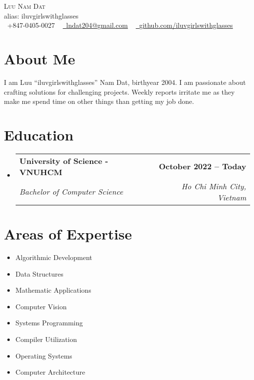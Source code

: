 \documentclass[letterpaper,11pt]{article}
\makeatletter
\newcommand{\resumeSubheading}[4]{
\vspace{-2pt}\item
\begin{tabular*}{1.0\textwidth}[t]{l@{\extracolsep{\fill}}r}
\textbf{#1} & \textbf{\small #2} \\
\textit{\small#3} & \textit{\small #4} \\
    \end{tabular*}\vspace{-7pt}
}
\newcommand{\resumeSubHeadingListStart}{\begin{itemize}[leftmargin=0.0in, label={}]}
\newcommand{\resumeSubHeadingListEnd}{\end{itemize}}
\makeatother
\begin{document}

\begin{center}
{\Huge \scshape Luu Nam Dat} \\ \vspace{1pt}
alias: iluvgirlswithglasses \\ \vspace{1pt}
\small \raisebox{-0.1\height}\faPhone\ +847-0405-0027 ~ \href{mailto:lndat204@gmail.com}{\raisebox{-0.2\height}\faEnvelope\  \underline{lndat204@gmail.com}} ~ 
\href{https://github.com/iluvgirlswithglasses}{\raisebox{-0.2\height}\faGithub\ \underline{github.com/iluvgirlswithglasses}}
\vspace{-8pt}
\end{center}


\section{About Me}
I am Luu ``iluvgirlswithglasses'' Nam Dat, birthyear 2004. I am passionate about crafting solutions for challenging projects. Weekly reports irritate me as they make me spend time on other things than getting my job done.


\section{Education}
\resumeSubHeadingListStart
\resumeSubheading
{University of Science - VNUHCM}{October 2022 -- Today}
{Bachelor of Computer Science}{Ho Chi Minh City, Vietnam}
\resumeSubHeadingListEnd


\section{Areas of Expertise}
\begin{multicols}{4}
\begin{itemize}[itemsep=-5pt, parsep=3pt]
\item\small Algorithmic Development
\item Data Structures
\item Mathematic Applications
\item Computer Vision
\item Systems Programming
\item Compiler Utilization
\item Operating Systems
\item Computer Architecture
\end{itemize}
\end{multicols}
\vspace*{2.0\multicolsep}
\end{document}
